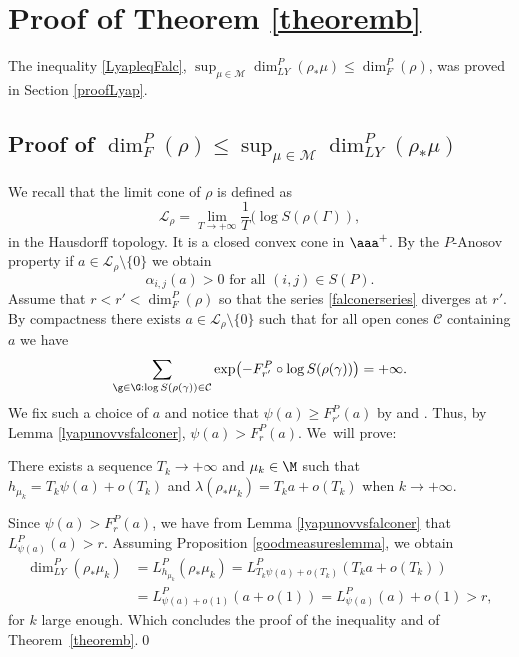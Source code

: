 \section{Proof of Theorem \ref{theoremb}}\label{prooftheoremb}
The inequality \eqref{LyapleqFalc},
\(\sup_{\mu \in \mathcal{M}}\dim_{LY}^P(\rho_\ast \mu) \le \dim_F^P(\rho)\),
was proved in Section \ref{proofLyap}.

\subsection{Proof of \(\dim_F^P(\rho)\le \sup_{\mu \in \mathcal{M}}\dim_{LY}^P(\rho_\ast \mu) \)}
We recall that the limit cone of \(\rho\) is defined as
\[
\mathcal{L}_{\rho} = \lim_{T \to +\infty}\frac{1}{T} (\log S (\rho (\Gamma)),
\]
in the Hausdorff topology. It is a closed convex cone in \(\aaa^+\).
By the \(P\)-Anosov property if \(a \in \mathcal{L}_{\rho} \setminus \lbrace 0\rbrace\) we obtain
\[
\alpha_{i,j}(a) > 0\text{ for all }(i,j) \in S(P).
\]
Assume that \(r < r' < \dim_F^P(\rho)\) so that the series \eqref{falconerseries} diverges at \(r'\). By compactness there exists \(a \in \mathcal{L}_{\rho}\setminus \lbrace 0\rbrace\) such that for all open cones \(\mathcal{C}\) containing \(a\) we have
\[
\sum_{\g \in \G: \log S (\rho(\gamma)) \in \mathcal{C}} \exp \bigl(-F_{r'}^P\circ \log S (\rho(\gamma)) \bigr) = +\infty.
\]
We fix such a choice of \(a\) and notice that \(\psi(a) \ge F_{r'}^P(a)\) by \cite[Lem.\,III.1.3]{Qui02a} and \cite[Lem.\,4.2]{sambarino}. Thus, by Lemma \ref{lyapunovvsfalconer}, \(\psi(a) > F_{r}^P(a)\). We~will prove:
\begin{proposition}\label{goodmeasureslemma}
There exists a sequence \(T_k \to +\infty\) and \(\mu_k \in \M\) such that \(h_{\mu_k} = T_k \psi(a) + o(T_k)\) and \(\lambda(\rho_*\mu_k) = T_k a + o(T_k)\) when \(k \to +\infty\).
\end{proposition}

Since \(\psi(a) > F_r^P(a)\), we have from Lemma \ref{lyapunovvsfalconer} that \(L_{\psi(a)}^P(a) > r\).
Assuming Proposition \ref{goodmeasureslemma}, we obtain
\begin{align*}\dim_{LY}^P(\rho_*\mu_k) &= L_{h_{\mu_k}}^P(\rho_*\mu_k) = L_{T_k\psi(a) + o(T_k)}^P(T_k a + o(T_k))
\\ &= L_{\psi(a) + o(1)}^P(a + o(1)) = L_{\psi(a)}^P(a) + o(1) > r,\end{align*}
for \(k\) large enough. Which concludes the proof of the inequality and of Theorem~\ref{theoremb}.\qed

